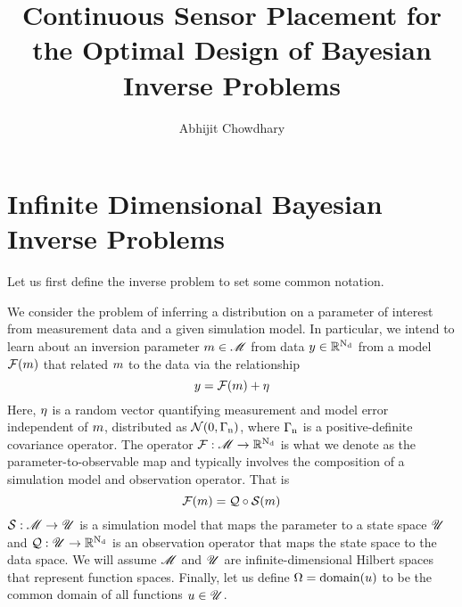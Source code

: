 \documentclass[a4paper,11pt]{article}
\begin{document}
\title{%
  Continuous Sensor Placement for the Optimal Design of Bayesian Inverse Problems
}
\author{%
  Abhijit Chowdhary
}
\maketitle


\section{Infinite Dimensional Bayesian Inverse Problems}
\label{sec:infinite-dimensional-bayesian-inverse-problems}

Let us first define the inverse problem to set some common notation.

We consider the problem of inferring a distribution on a parameter of interest from
measurement data and a given simulation model. In particular, we intend to learn about
an inversion parameter $m \in \mathscr{M}$ from data $y \in \mathbb{R}^{{\rm N_{d}}}$ from
a model $\mathcal{F}(m)$ that related $m$ to the data via the relationship
\begin{equation} \label{eq:data-model}
  y = \mathcal{F}(m) + \eta
\end{equation}
Here, $\eta$ is a random vector quantifying measurement and model error independent of
$m$, distributed as $\mathcal{N}(0, \Gamma_{\rm n})$, where $\Gamma_{\rm n}$ is a
positive-definite covariance operator. The operator $\mathcal{F}: \mathscr{M} \to \mathbb{R}^{{\rm N_{d}}}$
is what we denote as the parameter-to-observable map and typically involves the
composition of a simulation model and observation operator. That is
\begin{equation}
  \mathcal{F}(m) = \mathcal{Q} \circ \mathcal{S}(m)
\end{equation}
$\mathcal{S}: \mathscr{M} \to \mathscr{U}$ is a simulation model that maps the parameter to a
state space $\mathscr{U}$ and $\mathcal{Q}: \mathscr{U} \to \mathbb{R}^{{\rm N_{d}}}$ is an observation
operator that maps the state space to the data space. We will assume $\mathscr{M}$ and
$\mathscr{U}$ are infinite-dimensional Hilbert spaces that represent function spaces.
Finally, let us define $\Omega = {\rm domain}(u)$ to be the common domain of all
functions $u \in \mathscr{U}$. 
\end{document}
